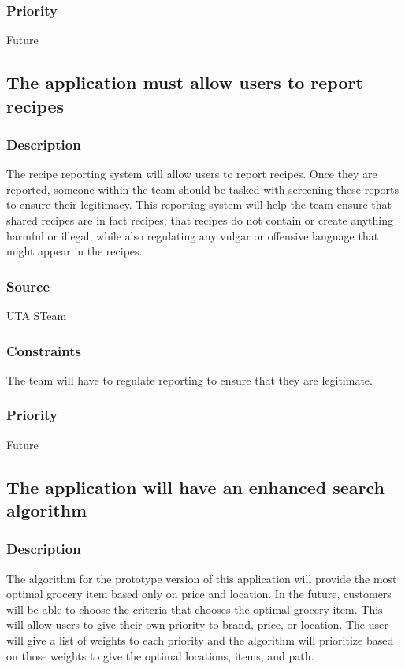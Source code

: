\subsubsection{Priority}
Future

\subsection{The application must allow users to report recipes}
\subsubsection{Description}
The recipe reporting system will allow users to report recipes. Once they are reported, someone within the team should be tasked with screening these reports to ensure their legitimacy. This reporting system will help the team ensure that shared recipes are in fact recipes, that recipes do not contain or create anything harmful or illegal, while also regulating any vulgar or offensive language that might appear in the recipes.
\subsubsection{Source}
UTA STeam
\subsubsection{Constraints}
The team will have to regulate reporting to ensure that they are legitimate.
\subsubsection{Priority}
Future

\subsection{The application will have an enhanced search algorithm}
\subsubsection{Description}
The algorithm for the prototype version of this application  will provide the most optimal grocery item based only on price and location. In the future, customers will be able to choose the criteria that chooses the optimal grocery item. This will allow users to give their own priority to brand, price, or location. The user will give a list of weights to each priority and the algorithm will prioritize based on those weights to give the optimal locations, items, and path.
